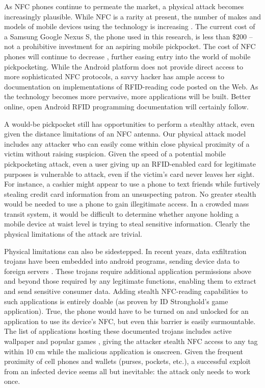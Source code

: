 \documentclass{sig-alternate}
\begin{document}
As NFC phones continue to permeate the market, a physical attack becomes increasingly plausible.  While NFC is a rarity at present, the number of makes and models of mobile devices using the technology is increasing \cite{list-of-nfc-phones}.  The current cost of a Samsung Google Nexus S, the phone used in this research, is less than \$200 -- not a prohibitive investment for an aspiring mobile pickpocket.  The cost of NFC phones will continue to decrease \cite{ds-nfc-enabling-technology}, further easing entry into the world of mobile pickpocketing.  While the Android platform does not provide direct access to more sophisticated NFC protocols, a savvy hacker has ample access to documentation on implementations of RFID-reading code posted on the Web.  As the technology becomes more pervasive, more applications will be built.  Better online, open Android RFID programming documentation will certainly follow.

A would-be pickpocket still has opportunities to perform a stealthy attack, even given the distance limitations of an NFC antenna.  Our physical attack model includes any attacker who can easily come within close physical proximity of a victim without raising suspicion.  Given the speed of a potential mobile pickpocketing attack, even a user giving up an RFID-enabled card for legitimate purposes is vulnerable to attack, even if the victim's card never leaves her sight.  For instance, a cashier might appear to use a phone to text friends while furtively stealing credit card information from an unsuspecting patron.  No greater stealth would be needed to use a phone to gain illegitimate access.  In a crowded mass transit system, it would be difficult to determine whether anyone holding a mobile device at waist level is trying to steal sensitive information.  Clearly the physical limitations of the attack are trivial.

Physical limitations can also be sidestepped.  In recent years, data exfiltration trojans have been embedded into android programs, sending device data to foreign servers \cite{droiddreamlight}.  These trojans require additional application permissions above and beyond those required by any legitimate functions, enabling them to extract and send sensitive consumer data.  Adding stealth NFC-reading capabilities to such applications is entirely doable (as proven by ID Stronghold's game application).  True, the phone would have to be turned on and unlocked for an application to use its device's NFC, but even this barrier is easily surmountable.  The list of applications hosting these documented trojans includes active wallpaper and popular games \cite{venturebeat-malicious-wallpaper}, giving the attacker stealth NFC access to any tag within 10 cm while the malicious application is onscreen.  Given the frequent proximity of cell phones and wallets (purses, pockets, etc.), a successful exploit from an infected device seems all but inevitable: the attack only needs to work once.  
\end{document}
